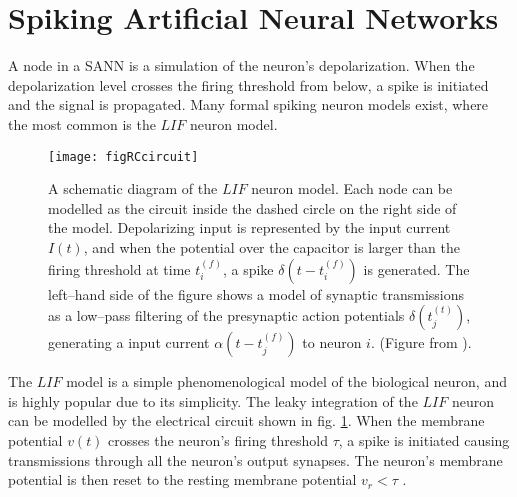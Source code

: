 \section{Spiking Artificial Neural Networks}
	\label{ssecDepolarizationSimulationByNIM}
	A node in a SANN is a simulation of the neuron's depolarization.
	When the depolarization level crosses the firing threshold from below, a spike is initiated and the signal is propagated.
	Many formal spiking neuron models exist, where the most common is the $LIF$ neuron model\cite{florian03}. %
	
	
\begin{figure}[tb!hp]
	\centering
	\texttt{[image: figRCcircuit]}
	\caption{A schematic diagram of the $LIF$ neuron model. 
			Each node can be modelled as the circuit inside the dashed circle on the right side of the model.
			Depolarizing input is represented by the input current $I(t)$, and when the potential over the capacitor is larger than the firing threshold at time $t_i^{(f)}$, a spike $\delta(t-t_i^{(f)})$ is generated. 
			The left--hand side of the figure shows a model of synaptic transmissions as a low--pass filtering of the presynaptic action potentials $\delta(t_j^{(t)})$, generating a input current $\alpha(t-t_j^{(f)})$ to neuron $i$.
			(Figure from \cite{gerstnerKistler2002KAP04}).
			}
	\label{figRCcircuitAvNeuronet}
\end{figure}
	The $LIF$ model is a simple phenomenological model of the biological neuron, and is highly popular due to its simplicity.
	The leaky integration of the $LIF$ neuron can be modelled by the electrical circuit shown in fig. \ref{figRCcircuitAvNeuronet}.
	When the membrane potential $v(t)$ crosses the neuron's firing threshold $\tau$, a spike is initiated causing transmissions through all the neuron's output synapses.
	The neuron's membrane potential is then reset to the resting membrane potential $v_r<\tau$ \cite{gerstnerKistler2002KAP04}.


